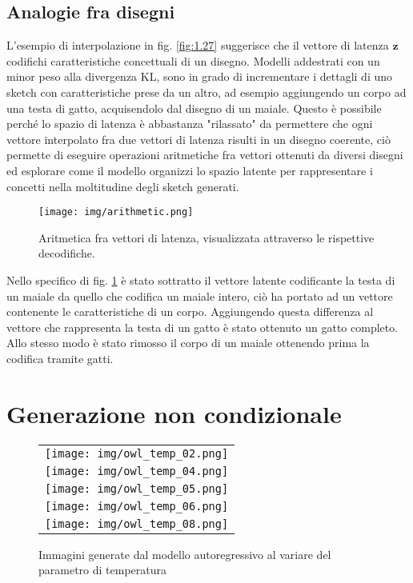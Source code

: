 \subsection{Analogie fra disegni} %
\label{sub:analogie_fra_disegni}
L'esempio di interpolazione in fig. \ref{fig:1.27} suggerisce che il vettore di latenza $\boldsymbol{z}$ codifichi caratteristiche concettuali di un disegno. Modelli addestrati con un minor peso alla divergenza KL, sono in grado di incrementare i dettagli di uno sketch con caratteristiche prese da un altro, ad esempio aggiungendo un corpo ad una testa di gatto, acquisendolo dal disegno di un maiale. Questo è possibile perché lo spazio di latenza è abbastanza "rilassato" da permettere che ogni vettore interpolato fra due vettori di latenza risulti in un disegno coerente, ciò permette di eseguire operazioni aritmetiche fra vettori ottenuti da diversi disegni ed esplorare come il modello organizzi lo spazio latente per rappresentare i concetti nella moltitudine degli sketch generati.

\begin{figure}
	\centering
	\texttt{[image: img/arithmetic.png]}
	\caption{Aritmetica fra vettori di latenza, visualizzata attraverso le rispettive decodifiche.}
	\label{fig:1.30}
\end{figure}

Nello specifico di fig. \ref{fig:1.30} è stato sottratto il vettore latente codificante la testa di un maiale da quello che codifica un maiale intero, ciò ha portato ad un vettore contenente le caratteristiche di un corpo. Aggiungendo questa differenza al vettore che rappresenta la testa di un gatto è stato ottenuto un gatto completo. Allo stesso modo è stato rimosso il corpo di un maiale ottenendo prima la codifica tramite gatti.
\newpage
\section{Generazione non condizionale} %
\label{sec:generazione_non_condizionale}
\begin{figure}[ht]
	\centering
	\begin{tabular}{c}
		\texttt{[image: img/owl\_temp\_02.png]} \\
		\texttt{[image: img/owl\_temp\_04.png]} \\
		\texttt{[image: img/owl\_temp\_05.png]} \\
		\texttt{[image: img/owl\_temp\_06.png]} \\
		\texttt{[image: img/owl\_temp\_08.png]}
	\end{tabular}
	\caption{Immagini generate dal modello autoregressivo al variare del parametro di temperatura}
	\label{fig:1.28}
\end{figure}

